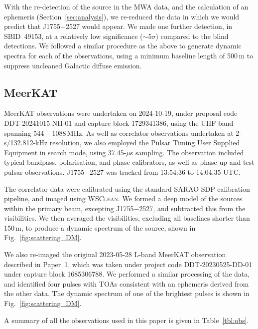 \documentclass[fleqn,usenatbib]{mnras}
\newcommand{\src}{J1755$-$2527}
\newcommand{\Fig}{Fig.}
\newcommand{\Sect}{Section}
\newcommand{\Tab}{Table}
\begin{document}
With the re-detection of the source in the MWA data, and the calculation of an ephemeris (\Sect~\ref{sec:analysis}), we re-reduced the data in which we would predict that \src{} would appear. We made one further detection, in SBID~49153, at a relatively low significance ($\sim5\sigma$) compared to the blind detections. We followed a similar procedure as the above to generate dynamic spectra for each of the observations, using a minimum baseline length of 500\,m to suppress uncleaned Galactic diffuse emission.


\subsection{MeerKAT} \label{sec:meerkat}

MeerKAT observations were undertaken on 2024-10-19, under proposal code 
DDT-20241015-NH-01 and capture block 1729341386, using the UHF band spanning 544 -- 1088\,MHz. As well as correlator observations undertaken at 2-s/132.812-kHz resolution, we also employed the Pulsar Timing User Supplied Equipment \citep[PTUSE;][]{2020PASA...37...28B} in search mode, using 37.45-$\mu$s sampling. The observation included typical bandpass, polarisation, and phase calibrators, as well as phase-up and test pulsar observations. \src{} was tracked from 13:54:36 to 14:04:35 UTC.

The correlator data were calibrated using the standard SARAO SDP calibration pipeline, and imaged using \textsc{WSClean}. We formed a deep model of the sources within the primary beam, excepting \src{}, and subtracted this from the visibilities. We then averaged the visibilities, excluding all baselines shorter than 150\,m, to produce a dynamic spectrum of the source, shown in \Fig~\ref{fig:scattering_DM}.

We also re-imaged the original 2023-05-28 L-band MeerKAT observation described in Paper~1, which was taken under project code DDT-20230525-DD-01 under capture block 1685306788. We performed a similar processing of the data, and identified four pulses with TOAs consistent with an ephemeris derived from the other data. The dynamic spectrum of one of the brightest pulses is shown in \Fig~\ref{fig:scattering_DM}.

A summary of all the observations used in this paper is given in \Tab~\ref{tbl:obs}.
\end{document}

